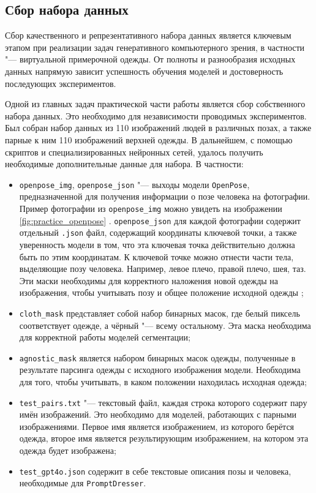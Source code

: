 \subsection{Сбор набора данных}
Сбор качественного и репрезентативного набора данных является ключевым этапом при реализации задач генеративного компьютерного зрения, в частности "--- виртуальной примерочной одежды. От полноты и разнообразия исходных данных напрямую зависит успешность обучения моделей и достоверность последующих экспериментов.

Одной из главных задач практической части работы является сбор собственного набора данных. Это необходимо для независимости проводимых экспериментов. Был собран набор данных из 110 изображений людей в различных позах, а также парные к ним 110 изображений верхней одежды. В дальнейшем, с помощью скриптов и специализированных нейронных сетей, удалось получить необходимые дополнительные данные для набора. В частности:
\begin{itemize}
    \item \texttt{openpose\_img}, \texttt{openpose\_json} "--- выходы модели \texttt{OpenPose}, предназначенной для получения информации о позе человека на фотографии. Пример фотографии из \texttt{openpose\_img} можно увидеть на изображении \ref{fig:practice_openpose} \cite{8765346}. \texttt{openpose\_json} для каждой фотографии содержит отдельный \texttt{.json} файл, содержащий координаты ключевой точки, а также уверенность модели в том, что эта ключевая точка действительно должна быть по этим координатам. К ключевой точке можно отнести части тела, выделяющие позу человека. Например, левое плечо, правой плечо, шея, таз. Эти маски необходимы для корректного наложения новой одежды на изображения, чтобы учитывать позу и общее положение исходной одежды \cite{8765346};
    \item \texttt{cloth\_mask} представляет собой набор бинарных масок, где белый пиксель соответствует одежде, а чёрный "--- всему остальному. Эта маска необходима для корректной работы моделей сегментации;
    \item \texttt{agnostic\_mask} является набором бинарных масок одежды, полученные в результате парсинга одежды с исходного изображения модели. Необходима для того, чтобы учитывать, в каком положении находилась исходная одежда;
    \item \texttt{test\_pairs.txt} "--- текстовый файл, каждая строка которого содержит пару имён изображений. Это необходимо для моделей, работающих с парными изображениями. Первое имя является изображением, из которого берётся одежда, второе имя является результирующим изображением, на котором эта одежда будет изображена;
    \item \texttt{test\_gpt4o.json} содержит в себе текстовые описания позы и человека, необходимые для \texttt{PromptDresser}.
\end{itemize}

